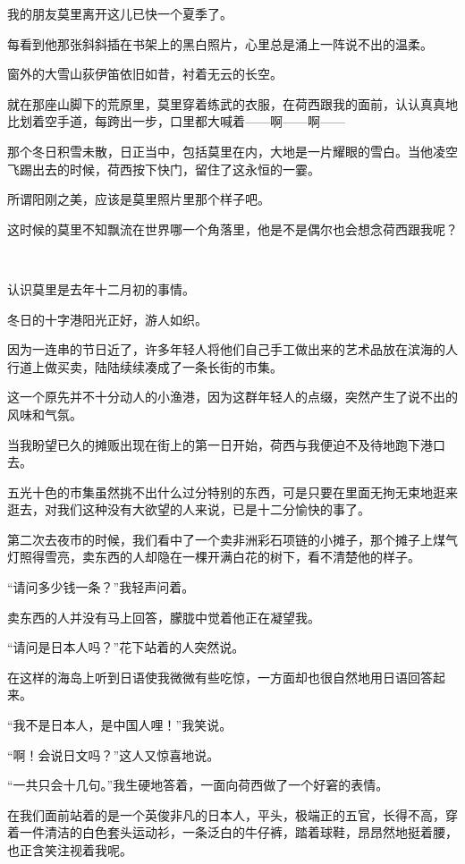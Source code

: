 \par 我的朋友莫里离开这儿已快一个夏季了。
\par 每看到他那张斜斜插在书架上的黑白照片，心里总是涌上一阵说不出的温柔。
\par 窗外的大雪山荻伊笛依旧如昔，衬着无云的长空。
\par 就在那座山脚下的荒原里，莫里穿着练武的衣服，在荷西跟我的面前，认认真真地比划着空手道，每跨出一步，口里都大喊着——啊——啊——
\par 那个冬日积雪未散，日正当中，包括莫里在内，大地是一片耀眼的雪白。当他凌空飞踢出去的时候，荷西按下快门，留住了这永恒的一霎。
\par 所谓阳刚之美，应该是莫里照片里那个样子吧。
\par 这时候的莫里不知飘流在世界哪一个角落里，他是不是偶尔也会想念荷西跟我呢？
\par  
\par 认识莫里是去年十二月初的事情。
\par 冬日的十字港阳光正好，游人如织。
\par 因为一连串的节日近了，许多年轻人将他们自己手工做出来的艺术品放在滨海的人行道上做买卖，陆陆续续凑成了一条长街的市集。
\par 这一个原先并不十分动人的小渔港，因为这群年轻人的点缀，突然产生了说不出的风味和气氛。
\par 当我盼望已久的摊贩出现在街上的第一日开始，荷西与我便迫不及待地跑下港口去。
\par 五光十色的市集虽然挑不出什么过分特别的东西，可是只要在里面无拘无束地逛来逛去，对我们这种没有大欲望的人来说，已是十二分愉快的事了。
\par 第二次去夜市的时候，我们看中了一个卖非洲彩石项链的小摊子，那个摊子上煤气灯照得雪亮，卖东西的人却隐在一棵开满白花的树下，看不清楚他的样子。
\par “请问多少钱一条？”我轻声问着。
\par 卖东西的人并没有马上回答，朦胧中觉着他正在凝望我。
\par “请问是日本人吗？”花下站着的人突然说。
\par 在这样的海岛上听到日语使我微微有些吃惊，一方面却也很自然地用日语回答起来。
\par “我不是日本人，是中国人哩！”我笑说。
\par “啊！会说日文吗？”这人又惊喜地说。
\par “一共只会十几句。”我生硬地答着，一面向荷西做了一个好窘的表情。
\par 在我们面前站着的是一个英俊非凡的日本人，平头，极端正的五官，长得不高，穿着一件清洁的白色套头运动衫，一条泛白的牛仔裤，踏着球鞋，昂昂然地挺着腰，也正含笑注视着我呢。
